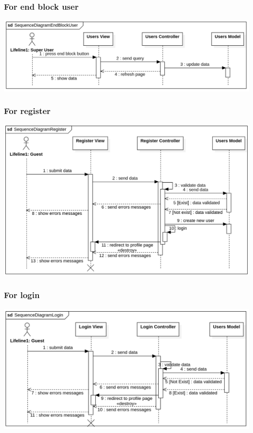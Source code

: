 \documentclass{article}
\begin{document}
	\subsubsection{For end block user}
	\includegraphics[scale=0.3]{diagrams/end_block_user_sequence.png}
	\subsubsection{For register}
	\includegraphics[scale=0.3]{diagrams/register_sequence.png}
	\subsubsection{For login}
	\includegraphics[scale=0.3]{diagrams/login_sequence.png}
	\clearpage
\end{document}
